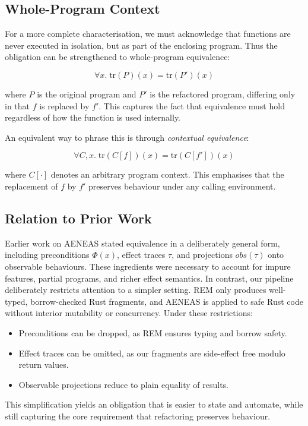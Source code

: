 \subsection{Whole-Program Context}
For a more complete characterisation, we must acknowledge that functions are
never executed in isolation, but as part of the enclosing program. Thus the
obligation can be strengthened to whole-program equivalence:

\[
\forall x.\; \text{tr}(P)(x) = \text{tr}(P')(x)
\]

where \(P\) is the original program and \(P'\) is the refactored program,
differing only in that \(f\) is replaced by \(f'\). This captures the fact that
equivalence must hold regardless of how the function is used internally.

An equivalent way to phrase this is through \textit{contextual equivalence}:

\[
\forall C, x.\; \text{tr}(C[f])(x) = \text{tr}(C[f'])(x)
\]

where \(C[\cdot]\) denotes an arbitrary program context. This emphasises that the
replacement of \(f\) by \(f'\) preserves behaviour under any calling
environment.

\subsection{Relation to Prior Work}
Earlier work on AENEAS stated equivalence in a deliberately general form,
including preconditions \(\Phi(x)\), effect traces \(\tau\), and projections
\(\mathit{obs}(\tau)\) onto observable behaviours. These ingredients were
necessary to account for impure features, partial programs, and richer effect
semantics. In contrast, our pipeline deliberately restricts attention to a
simpler setting. REM only produces well-typed, borrow-checked Rust fragments,
and AENEAS is applied to safe Rust code without interior mutability or
concurrency. Under these restrictions:
\begin{itemize}
    \item Preconditions can be dropped, as REM ensures typing and borrow safety.
    \item Effect traces can be omitted, as our fragments are side-effect free
    modulo return values.
    \item Observable projections reduce to plain equality of results.
\end{itemize}

This simplification yields an obligation that is easier to state and automate,
while still capturing the core requirement that refactoring preserves behaviour.

